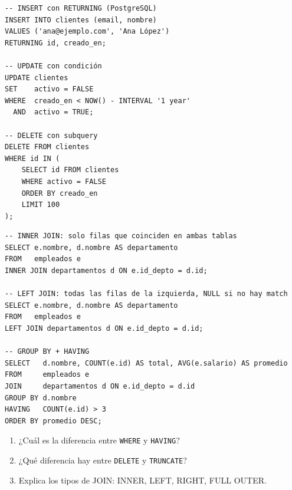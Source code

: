 \begin{lstlisting}[caption={DML: INSERT, UPDATE, DELETE}]
-- INSERT con RETURNING (PostgreSQL)
INSERT INTO clientes (email, nombre)
VALUES ('ana@ejemplo.com', 'Ana López')
RETURNING id, creado_en;

-- UPDATE con condición
UPDATE clientes
SET    activo = FALSE
WHERE  creado_en < NOW() - INTERVAL '1 year'
  AND  activo = TRUE;

-- DELETE con subquery
DELETE FROM clientes
WHERE id IN (
    SELECT id FROM clientes
    WHERE activo = FALSE
    ORDER BY creado_en
    LIMIT 100
);
\end{lstlisting}

\begin{lstlisting}[caption={SELECT con JOINs}]
-- INNER JOIN: solo filas que coinciden en ambas tablas
SELECT e.nombre, d.nombre AS departamento
FROM   empleados e
INNER JOIN departamentos d ON e.id_depto = d.id;

-- LEFT JOIN: todas las filas de la izquierda, NULL si no hay match
SELECT e.nombre, d.nombre AS departamento
FROM   empleados e
LEFT JOIN departamentos d ON e.id_depto = d.id;

-- GROUP BY + HAVING
SELECT   d.nombre, COUNT(e.id) AS total, AVG(e.salario) AS promedio
FROM     empleados e
JOIN     departamentos d ON e.id_depto = d.id
GROUP BY d.nombre
HAVING   COUNT(e.id) > 3
ORDER BY promedio DESC;
\end{lstlisting}

\begin{entrevistabox}
\begin{enumerate}
  \item ¿Cuál es la diferencia entre \texttt{WHERE} y \texttt{HAVING}?
  \item ¿Qué diferencia hay entre \texttt{DELETE} y \texttt{TRUNCATE}?
  \item Explica los tipos de JOIN: INNER, LEFT, RIGHT, FULL OUTER.
\end{enumerate}
\end{entrevistabox}
